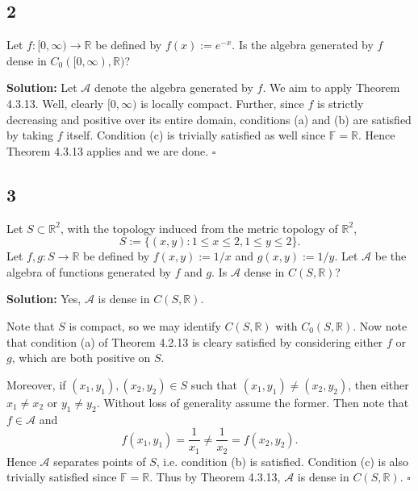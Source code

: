 \documentclass[12pt]{article}
\newcounter{ProofCounter}
\newenvironment{Solution}{\stepcounter{ProofCounter}\textbf{Solution:}}{\hfill$\square$}
\begin{document}
\subsection*{2}
\begin{tcolorbox}
  Let $f : [0, \infty) \rightarrow \mathbb{R}$ be defined by $f(x) := e^{-x}$. Is the algebra generated by $f$ dense in $C_0([0,\infty), \mathbb{R})$?
\end{tcolorbox}
\begin{Solution}
  Let $\mathcal{A}$ denote the algebra generated by $f$.
  We aim to apply Theorem 4.3.13. Well, clearly $[0, \infty)$ is locally compact. Further, since $f$ is strictly
  decreasing and positive over its entire domain, conditions (a) and (b) are satisfied by taking $f$ itself. Condition (c) is trivially satisfied as well since
  $\mathbb{F} = \mathbb{R}$. Hence Theorem 4.3.13 applies and we are done.
\end{Solution}


\newpage
\subsection*{3}
\begin{tcolorbox}
  Let $S \subset \mathbb{R}^2$, with the topology induced from the metric topology of $\mathbb{R}^2$,
  \[
    S := \{(x,y) : 1 \leq x \leq 2, 1 \leq y \leq 2\}.
  \]
  Let $f, g : S \rightarrow \mathbb{R}$ be defined by $f(x,y) := 1 / x$ and $g(x,y) := 1 / y$. Let $\mathcal{A}$ be the algebra of functions generated
  by $f$ and $g$. Is $\mathcal{A}$ dense in $C(S, \mathbb{R})$?
\end{tcolorbox}
\begin{Solution}
  Yes, $\mathcal{A}$ is dense in $C(S, \mathbb{R})$.

  Note that $S$ is compact, so we may identify $C(S, \mathbb{R})$ with $C_0(S, \mathbb{R})$. Now note that condition (a) of Theorem 4.2.13 is cleary
  satisfied by considering either $f$ or $g$, which are both positive on $S$. 
  
  Moreover, if $(x_1,y_1), (x_2, y_2) \in S$ such that $(x_1, y_1) \neq
  (x_2, y_2)$, then either $x_1 \neq x_2$ or $y_1 \neq y_2$. Without loss of generality assume the former. Then note that $f \in \mathcal{A}$ and
  \[
    f(x_1, y_1) = \frac{1}{x_1} \neq \frac{1}{x_2} = f(x_2, y_2). 
  \]
  Hence $\mathcal{A}$ separates points of $S$, i.e. condition (b) is satisfied. Condition (c) is
  also trivially satisfied since $\mathbb{F} = \mathbb{R}$. Thus by Theorem 4.3.13, $\mathcal{A}$ is dense in $C(S, \mathbb{R})$.
\end{Solution}
\end{document}
